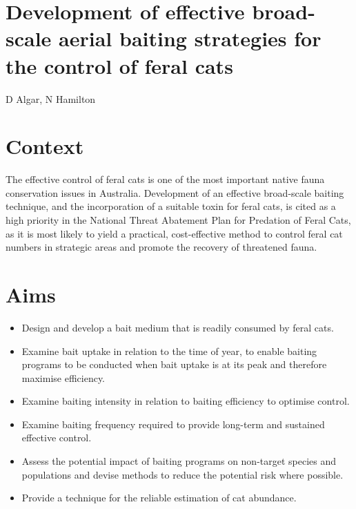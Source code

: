 \documentclass[version=last, 
    paper=a4, %
    10pt, %
    usenames,
    dvipsnames, 
    oneside, %
    headings=openany, %
    DIV=15 %
]{scrbook}
\begin{document}
\section*{Development of effective broad-scale aerial baiting strategies for the
control of feral cats
}

D Algar, N Hamilton


\section*{Context}
The effective control of feral cats is one of the most important native
fauna conservation issues in Australia. Development of an effective
broad-scale baiting technique, and the incorporation of a suitable toxin
for feral cats, is cited as a high priority in the National Threat
Abatement Plan for Predation of Feral Cats, as it is most likely to
yield a practical, cost-effective method to control feral cat numbers in
strategic areas and promote the recovery of threatened fauna.



\section*{Aims}
\begin{itemize}
\itemsep1pt\parskip0pt
\item
  Design and develop a bait medium that is readily consumed by feral
  cats.
\item
  Examine bait uptake in relation to the time of year, to enable baiting
  programs to be conducted when bait uptake is at its peak and therefore
  maximise efficiency.
\item
  Examine baiting intensity in relation to baiting efficiency to
  optimise control.
\item
  Examine baiting frequency required to provide long-term and sustained
  effective control.
\item
  Assess the potential impact of baiting programs on non-target species
  and populations and devise methods to reduce the potential risk where
  possible.
\item
  Provide a technique for the reliable estimation of cat abundance.
\end{itemize}
\end{document}
